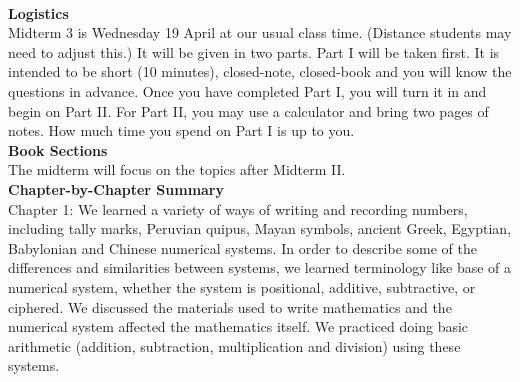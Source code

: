 \documentclass[11pt,fleqn]{article}
\begin{document}
\renewcommand{\headrulewidth}{0pt}
\newcommand{\blank}[1]{\rule{#1}{0.75pt}}
\newcommand{\bc}{\begin{center}}
\newcommand{\ec}{\end{center}}
\renewcommand{\d}{\displaystyle}

\vspace*{-0.7in}

\begin{center}
  \large
  \\
\end{center}
\noindent\textbf{Logistics}\\

Midterm 3 is Wednesday 19 April at our usual class time. (Distance students may need to adjust this.) It will be given in two parts. Part I will be taken first. It is intended to be short (10 minutes), closed-note, closed-book and you will know the questions in advance. Once you have completed Part I, you will turn it in and begin on Part II.  For Part II, you may use a calculator and bring two pages of notes. How much time you spend on Part I is up to you.  \\

\noindent\textbf{Book Sections}\\

The midterm will focus on the topics after Midterm II.\\

\noindent\textbf{Chapter-by-Chapter Summary}\\

Chapter 1: We learned a variety of ways of writing and recording numbers, including tally marks,  Peruvian quipus, Mayan symbols, ancient Greek, Egyptian, Babylonian and Chinese numerical systems. In order to describe some of the differences and similarities between systems, we learned terminology like base of a numerical system, whether the system is positional, additive, subtractive,  or ciphered. We discussed the materials used to write mathematics and the numerical system affected the mathematics itself. We practiced doing basic arithmetic (addition, subtraction, multiplication and division) using these systems.\\
\end{document}
